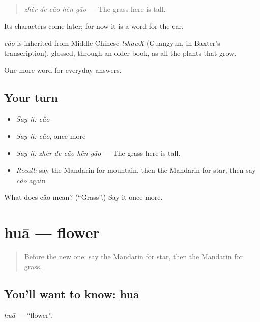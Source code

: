 \begin{quote}
\emph{zhèr de cǎo hěn gāo} — The grass here is tall.
\end{quote}

Its characters come later; for now it is a word for the ear.

\begin{cousinweb}
\emph{cǎo} is inherited from Middle Chinese \emph{tshawX} (Guangyun, in Baxter's transcription), glossed, through an older book, as all the plants that grow.
\end{cousinweb}

\begin{grammarlens}[title={What you've built}]
One more word for everyday answers.
\end{grammarlens}

\subsection*{Your turn}
\begin{itemize}
\raggedright
  \item \emph{Say it:} \emph{cǎo}
  \item \emph{Say it:} \emph{cǎo}, once more
  \item \emph{Say it:} \emph{zhèr de cǎo hěn gāo} — The grass here is tall.
  \item \emph{Recall:} say the Mandarin for mountain, then the Mandarin for star, then say \emph{cǎo} again
\end{itemize}

\begin{tcolorbox}[breakable,colback=teal!4,colframe=teal!35!black,title={Before you move on}]
What does cǎo mean? (\textquotedblleft{}Grass\textquotedblright{}.) Say it once more.
\end{tcolorbox}
\section[huā]{huā — flower}

\label{lesson:ZH-C68-hua}



\begin{quote}
Before the new one: say the Mandarin for star, then the Mandarin for grass.
\end{quote}

\subsection*{You'll want to know: huā}
\emph{huā} — \textquotedblleft{}flower\textquotedblright{}.

